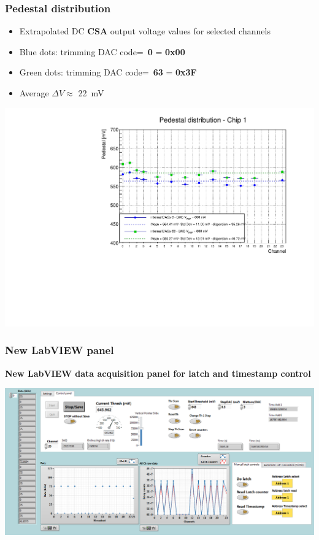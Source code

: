 \documentclass[aspectratio=169]{beamer}
\begin{document}
	\begin{frame}
	\frametitle{Pedestal distribution}
	\begin{itemize}
		\item Extrapolated DC \textbf{CSA} output voltage values for selected channels
		\item {\color{blue}Blue} dots: trimming DAC code=~\textbf{0} = \textbf{0x00}
		\item {\color{green}Green} dots: trimming DAC code=~\textbf{63} = \textbf{0x3F}
		\item Average $\Delta V\approx$ 22~mV
	\end{itemize}
	\begin{center}
		\includegraphics[width=0.55 \textwidth]{data/DAC_V_REF_600mV-Copia.pdf}
	\end{center}
	\end{frame}

	\begin{frame}
		\frametitle{New LabVIEW panel}
		\begin{center}
			\textbf{New LabVIEW data acquisition panel for latch and timestamp control}
		\end{center}
		\begin{center}
			\includegraphics[width=0.9 \textwidth]{IMG2/fig7}
		\end{center}
	\end{frame}
\end{document}

